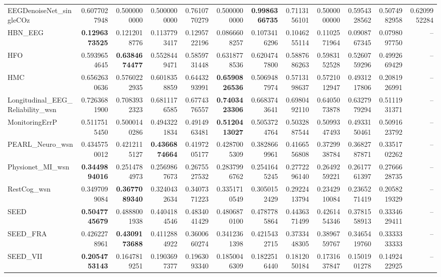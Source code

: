 \begin{table}[htbp]
\begin{tabular}{lrrrrrrrrrrr}
EEGDenoiseNet_singleCOz & 0.6077027948 & 0.5000000000 & 0.5000000000 & 0.7610770279 & 0.5000000000 & \bfseries 0.9986366735 & 0.7113156101 & 0.5000000000 & 0.5954328562 & 0.5074982958 & 0.6209952284 \\
HBN_EEG & \bfseries 0.1296373525 & 0.1212018776 & 0.1137793417 & 0.1295722196 & 0.0866608257 & 0.1073416296 & 0.1046255114 & 0.1102571964 & 0.0908767345 & 0.0798097750 & -- \\
HFO & 0.5939654645 & \bfseries 0.6384674477 & 0.5528449471 & 0.5859731448 & 0.6318778536 & 0.6204747800 & 0.5887686263 & 0.5983152528 & 0.5260759296 & 0.4992669429 & -- \\
HMC & 0.6562630636 & 0.5760222935 & 0.6018358859 & 0.6443293991 & \bfseries 0.6590826536 & 0.5069487974 & 0.5713198637 & 0.5721012947 & 0.4931217806 & 0.2081926991 & -- \\
Longitudinal_EEG_Reliability_wsn & 0.7263681900 & 0.7083932323 & 0.6811176585 & 0.6774376557 & \bfseries 0.7403423306 & 0.6683743641 & 0.6980492110 & 0.6405073878 & 0.6327979294 & 0.5111931371 & -- \\
MonitoringErrP & 0.5117515450 & 0.5000140286 & 0.4943221834 & 0.4914963481 & \bfseries 0.5120413027 & 0.5053724764 & 0.5032887544 & 0.5099347493 & 0.4933150461 & 0.5091623792 & -- \\
PEARL_Neuro_wsn & 0.4345750012 & 0.4212115127 & \bfseries 0.4366874664 & 0.4197205177 & 0.4287005309 & 0.3828669961 & 0.4166556808 & 0.3729938784 & 0.3682787871 & 0.3351702262 & -- \\
Physionet_MI_wsn & \bfseries 0.3449894016 & 0.2514784973 & 0.2569867673 & 0.2675527532 & 0.2837996762 & 0.2541645245 & 0.2772296140 & 0.2649259221 & 0.2617761397 & 0.2766628735 & -- \\
RestCog_wsn & 0.3497099084 & \bfseries 0.3677089340 & 0.3240432634 & 0.3407371223 & 0.3351710549 & 0.3050152429 & 0.2922413794 & 0.2342910084 & 0.2365271419 & 0.2058219329 & -- \\
SEED & \bfseries 0.5047745679 & 0.4888001938 & 0.4404184546 & 0.4834041429 & 0.4806870100 & 0.4787785864 & 0.4436371499 & 0.4261454346 & 0.3781558913 & 0.3334629411 & -- \\
SEED_FRA & 0.4262278961 & \bfseries 0.4309173688 & 0.4112884922 & 0.3600660274 & 0.3412361398 & 0.4215432715 & 0.3733448305 & 0.3896759767 & 0.3465419760 & 0.3333333333 & -- \\
SEED_VII & \bfseries 0.2054753143 & 0.1647819251 & 0.1903697377 & 0.1963093340 & 0.1850046309 & 0.1822516440 & 0.1812050184 & 0.1731637847 & 0.1501901278 & 0.1492422925 & -- \\

\end{tabular}
\end{table}
